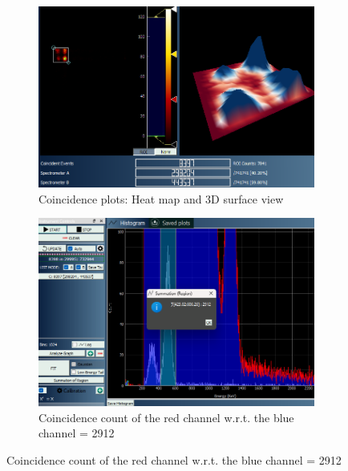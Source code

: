 \begin{figure}[H]
    \begin{subfigure}{\linewidth}
    \includegraphics[width=1\textwidth]{images/170/3d.png}
    \caption{Coincidence plots: Heat map and 3D surface view}
    \end{subfigure}
    
    \begin{subfigure}{\linewidth}
    \includegraphics[width=1\textwidth]{images/170/ccred.png}
    \caption{Coincidence count of the red channel w.r.t. the blue channel = 2912}
    \end{subfigure}


\end{figure}

